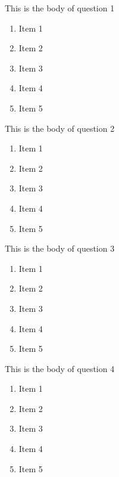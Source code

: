 \documentclass{article}
\begin{document}
This is the body of question 1
\begin{enumerate}
    \item
    Item 1
    \item
    Item 2
    \item
    Item 3
    \item
    Item 4
    \item
    Item 5
\end{enumerate}




This is the body of question 2
\begin{enumerate}
    \item
    Item 1
    \item
    Item 2
    \item
    Item 3
    \item
    Item 4
    \item
    Item 5
\end{enumerate}


This is the body of question 3
\begin{enumerate}
    \item
    Item 1
    \item
    Item 2
    \item
    Item 3
    \item
    Item 4
    \item
    Item 5
\end{enumerate}



This is the body of question 4
\begin{enumerate}
    \item
    Item 1
    \item
    Item 2
    \item
    Item 3
    \item
    Item 4
    \item
    Item 5
\end{enumerate}
\end{document}
